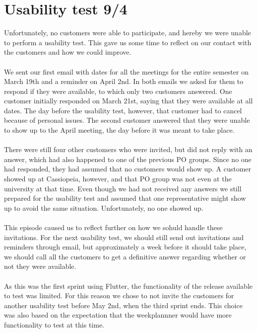 \section{Usability test 9/4}\label{sprint-2-usability-test}
Unfortunately, no customers were able to participate, and hereby we were unable to perform a usability test.
This gave us some time to reflect on our contact with the customers and how we could improve.
\\\\
We sent our first email with dates for all the meetings for the entire semester on March 19th and a reminder on April 2nd.
In both emails we asked for them to respond if they were available, to which only two customers answered. 
One customer initially responded on March 21st, saying that they were available at all dates. 
The day before the usability test, however, that customer had to cancel because of personal issues.
The second customer answered that they were unable to show up to the April meeting, the day before it was meant to take place.
\\\\
There were still four other customers who were invited, but did not reply with an answer, which had also happened to one of the previous PO groups.
Since no one had responded, they had assumed that no customers would show up.
A customer showed up at Cassiopeia, however, and that PO group was not even at the university at that time. 
Even though we had not received any answers we still prepared for the usability test and assumed that one representative might show up to avoid the same situation.
Unfortunately, no one showed up.
\\\\
This episode caused us to reflect further on how we sohuld handle these invitations.
For the next usability test, we should still send out invitations and reminders through email, but approximately a week before it should take place, we should call all the customers to get a definitive answer regarding whether or not they were available. 
\\\\
As this was the first sprint using Flutter, the functionality of the release available to test was limited. 
For this reason we chose to not invite the customers for another usability test before May 2nd, when the third sprint ends.
This choice was also based on the expectation that the weekplannner would have more functionality to test at this time.
